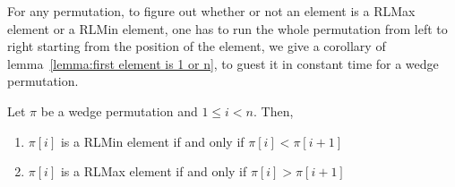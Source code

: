 \documentclass[a4paper]{llncs}
\newcounter{num}
\begin{document}
For any permutation, to figure out whether or not an element is a RLMax element or a RLMin element,
one has to run the whole permutation from left to right starting 
from the position of the element, we give a corollary of lemma~\ref{lemma:first element is 1 or n}, to guest it in constant time for a wedge permutation. 


\begin{corollary}
\label{corollary:max is ascent}
Let $\pi$ be a wedge permutation and $1 \leq i < n$. Then,
\begin{enumerate}
\item $\pi[i]$ is a RLMin element if and only if $\pi[i]<\pi[i+1]$
\item $\pi[i]$ is a RLMax element if and only if $\pi[i]>\pi[i+1]$
\end{enumerate}

\end{corollary}




%
%
%
%
%
\end{document}
